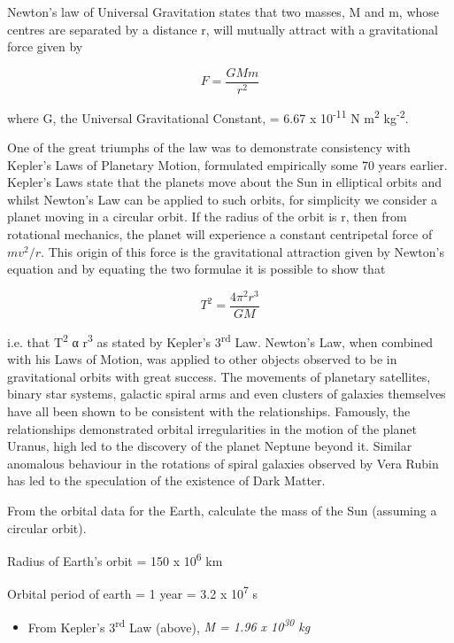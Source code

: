\documentclass[revision-guide.tex]{subfiles}
\begin{document}
Newton's law of Universal Gravitation states that two masses, M and m,
whose centres are separated by a distance r, will mutually attract with
a gravitational force given by

\[F = \frac{G M m }{ r^{2}}\]

where G, the Universal Gravitational Constant, = 6.67 x
10\textsuperscript{-11} N m\textsuperscript{2} kg\textsuperscript{-2}.

One of the great triumphs of the law was to demonstrate consistency with
Kepler's Laws of Planetary Motion, formulated empirically some 70 years
earlier. Kepler's Laws state that the planets move about the Sun in
elliptical orbits and whilst Newton's Law can be applied to such orbits,
for simplicity we consider a planet moving in a circular orbit. If the
radius of the orbit is r, then from rotational mechanics, the planet
will experience a constant centripetal force of $mv^{2}/r$.
This origin of this force is the gravitational attraction given by
Newton's equation and by equating the two formulae it is possible to
show that

\begin{equation}
T^{2} = \frac{4 \pi^{2} r^{3}}{ G M}
\end{equation}

i.e. that T\textsuperscript{2} α r\textsuperscript{3} as stated by
Kepler's 3\textsuperscript{rd} Law. Newton's Law, when combined with his
Laws of Motion, was applied to other objects observed to be in
gravitational orbits with great success. The movements of planetary
satellites, binary star systems, galactic spiral arms and even clusters
of galaxies themselves have all been shown to be consistent with the
relationships. Famously, the relationships demonstrated orbital
irregularities in the motion of the planet Uranus, high led to the
discovery of the planet Neptune beyond it. Similar anomalous behaviour
in the rotations of spiral galaxies observed by Vera Rubin has led to
the speculation of the existence of Dark Matter.

\begin{example}

From the orbital data for the Earth, calculate the mass of the Sun
(assuming a circular orbit).

\answer

Radius of Earth's orbit = 150 x 10\textsuperscript{6} km

Orbital period of earth = 1 year = 3.2 x 10\textsuperscript{7} s

\begin{itemize}
\item
  From Kepler's 3\textsuperscript{rd} Law (above), \emph{M = 1.96 x
  10\textsuperscript{30} kg}
\end{itemize}

\end{example}
\end{document}
